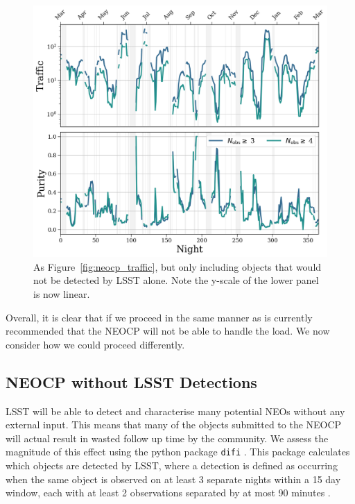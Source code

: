 \documentclass[twocolumn]{aastex631}
\newcommand{\needcite}{{\color{magenta}{(needs citation)}}}
\begin{document}
\begin{figure}
    \centering
    \includegraphics[width=\textwidth]{traffic_purity_unfindable.png}
    \caption{As Figure~\ref{fig:neocp_traffic}, but only including objects that would not be detected by LSST alone. Note the y-scale of the lower panel is now linear.}
    \label{fig:neocp_traffic_unfindable}
\end{figure}

Overall, it is clear that if we proceed in the same manner as is currently recommended that the NEOCP will not be able to handle the load. We now consider how we could proceed differently.

\subsection{NEOCP without LSST Detections}\label{sec:no_LSST_detections}

LSST will be able to detect and characterise many potential NEOs without any external input. This means that many of the objects submitted to the NEOCP will actual result in wasted follow up time by the community. We assess the magnitude of this effect using the python package \texttt{difi} \citep{difi}. This package calculates which objects are detected by LSST, where a detection is defined as occurring when the same object is observed on at least 3 separate nights within a 15 day window, each with at least 2 observations separated by at most 90 minutes \needcite{}.
\end{document}
